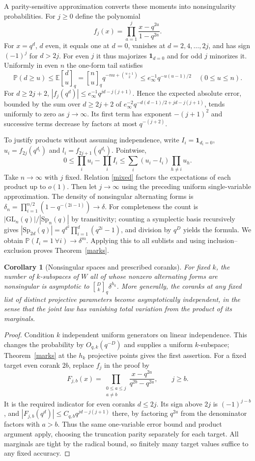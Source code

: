 \documentclass[11pt]{article}
\newtheorem{corollary}[theorem]{Corollary}
\newcommand{\PP}{\mathbb P}
\newcommand{\E}{\mathbb E}
\newcommand{\gb}[2]{\genfrac{[}{]}{0pt}{}{#1}{#2}_{q}}
\begin{document}
A parity-sensitive approximation converts these moments into nonsingularity probabilities. For $j\ge0$ define the polynomial
\[
 f_j(x)=\prod_{a=1}^j\frac{x-q^{2a}}{1-q^{2a}} .
\]
For $x=q^d$, $d$ even, it equals one at $d=0$, vanishes at $d=2,4,\ldots,2j$, and has sign $(-1)^j$ for $d>2j$. For even $j$ it thus majorizes $\mathbf1_{d=0}$ and for odd $j$ minorizes it. Uniformly in even $n$ the one-form tail satisfies
\[
 \PP(d\ge u)\le\E\gb du
 =\gb nu q^{-nu+\binom{u+1}2}\le e_\infty^{-1}q^{-u(u-1)/2}\quad(0\le u\le n).
\]
For $d\ge2j+2$, $|f_j(q^d)|\le e_\infty^{-1} q^{jd-j(j+1)}$. Hence the expected absolute error, bounded by the sum over $d\ge2j+2$ of
$e_\infty^{-2}q^{-d(d-1)/2+jd-j(j+1)}$, tends uniformly to zero as $j\to\infty$. Its first term has exponent $-(j+1)^2$ and successive terms decrease by factors at most $q^{-(j+2)}$.

To justify products without assuming independence, write $I_i=\mathbf1_{d_i=0}$, $u_i=f_{2j}(q^{d_i})$ and $l_i=f_{2j+1}(q^{d_i})$. Pointwise,
\[
 0\le\prod_i u_i-\prod_i I_i\le
 \sum_i(u_i-l_i)\prod_{h\ne i}u_h.
\]
Take $n\to\infty$ with $j$ fixed. Relation \eqref{mixed} factors the expectations of each product up to $o(1)$. Then let $j\to\infty$ using the preceding uniform single-variable approximation. The density of nonsingular alternating forms is
$\delta_n=\prod_{i=1}^{n/2}(1-q^{-(2i-1)})\to\delta$. For completeness the count is $|\mathrm{GL}_n(q)|/|\mathrm{Sp}_n(q)|$ by transitivity; counting a symplectic basis recursively gives $|\mathrm{Sp}_{2d}(q)|=q^{d^2}\prod_{i=1}^d(q^{2i}-1)$, and division by $q^D$ yields the formula. We obtain $\PP(I_i=1\ \forall i)\to\delta^m$. Applying this to all sublists and using inclusion--exclusion proves Theorem~\ref{marks}.

\begin{corollary}[Nonsingular spaces and prescribed coranks]
For fixed $k$, the number of $k$-subspaces of $W$ all of whose nonzero alternating forms are nonsingular is asymptotic to $\gb Dk\delta^{h_k}$. More generally, the coranks at any fixed list of distinct projective parameters become asymptotically independent, in the sense that the joint law has vanishing total variation from the product of its marginals.
\end{corollary}
\begin{proof}
Condition $k$ independent uniform generators on linear independence. This changes the probability by $O_{q,k}(q^{-D})$ and supplies a uniform $k$-subspace; Theorem~\ref{marks} at the $h_k$ projective points gives the first assertion. For a fixed target even corank $2b$, replace $f_j$ in the proof by
\[
 F_{j,b}(x)=\prod_{\substack{0\le a\le j\\a\ne b}}\frac{x-q^{2a}}{q^{2b}-q^{2a}},\qquad j\ge b.
\]
It is the required indicator for even coranks $d\le2j$. Its sign above $2j$ is $(-1)^{j-b}$, and $|F_{j,b}(q^d)|\le C_{q,b}q^{jd-j(j+1)}$ there, by factoring $q^{2a}$ from the denominator factors with $a>b$. Thus the same one-variable error bound and product argument apply, choosing the truncation parity separately for each target. All marginals are tight by the radical bound, so finitely many target values suffice to any fixed accuracy.
\end{proof}
\end{document}
